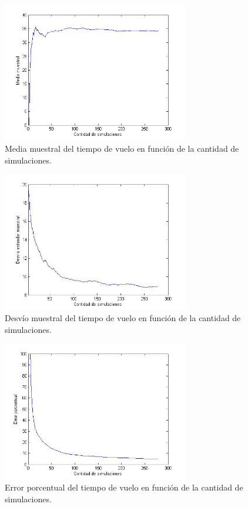\documentclass[10pt,journal,compsoc]{IEEEtran}
\begin{document}
\begin{figure}[t]
\label{fig:3d}
\begin{center}
\centering
\includegraphics[width=3.2in]{media_muestral.jpg}
\caption{Media muestral del tiempo de vuelo en funci\'on de la cantidad de simulaciones.}
\end{center}
\end{figure}

\begin{figure}[t]
\label{fig:3d}
\begin{center}
\centering
\includegraphics[width=3.2in]{desvio.jpg}
\caption{Desv\'io muestral del tiempo de vuelo en funci\'on de la cantidad de simulaciones.}
\end{center}
\end{figure}

\begin{figure}[t]
\label{fig:3d}
\begin{center}
\centering
\includegraphics[width=3.2in]{error_porcentual.jpg}
\caption{Error porcentual del tiempo de vuelo en funci\'on de la cantidad de simulaciones.}
\end{center}
\end{figure}
\end{document}
